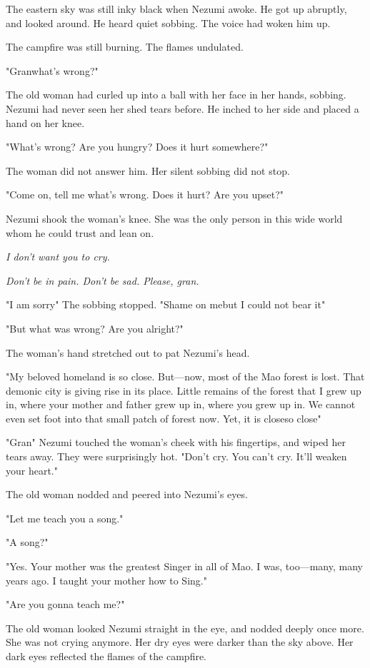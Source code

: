 \mybreak

The eastern sky was still inky black when Nezumi awoke. He got up
abruptly, and looked around. He heard quiet sobbing. The voice had woken
him up.

The campfire was still burning. The flames undulated.

"Gran\el what's wrong?"

The old woman had curled up into a ball with her face in her hands,
sobbing. Nezumi had never seen her shed tears before. He inched to her
side and placed a hand on her knee.

"What's wrong? Are you hungry? Does it hurt somewhere?"

The woman did not answer him. Her silent sobbing did not stop.

"Come on, tell me what's wrong. Does it hurt? Are you upset?"~

Nezumi shook the woman's knee. She was the only person in this wide
world whom he could trust and lean on.

\emph{I don't want you to cry.}

\emph{Don't be in pain. Don't be sad. Please, gran.}

"I am sorry\el " The sobbing stopped. "Shame on me\el but I could not
bear it\el "

"But what was wrong? Are you alright?"

The woman's hand stretched out to pat Nezumi's head.

"My beloved homeland is so close. But---now, most of the Mao forest is
lost. That demonic city is giving rise in its place. Little remains of
the forest that I grew up in, where your mother and father grew up in,
where you grew up in. We cannot even set foot into that small patch of
forest now. Yet, it is close\el so close\el "

"Gran\el " Nezumi touched the woman's cheek with his fingertips, and
wiped her tears away. They were surprisingly hot. "Don't cry. You can't
cry. It'll weaken your heart."

The old woman nodded and peered into Nezumi's eyes.

"Let me teach you a song."

"A song?"

"Yes. Your mother was the greatest Singer in all of Mao. I was,
too---many, many years ago. I taught your mother how to Sing."

"Are you gonna teach me?"

The old woman looked Nezumi straight in the eye, and nodded deeply once
more. She was not crying anymore. Her dry eyes were darker than the sky
above. Her dark eyes reflected the flames of the campfire.

